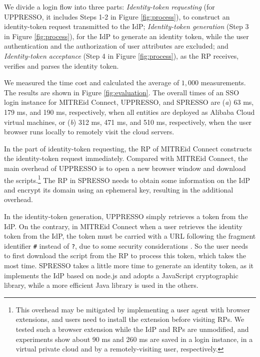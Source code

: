 We divide a login flow into three parts:
{\em Identity-token requesting} (for UPPRESSO, it includes Steps 1-2 in Figure \ref{fig:process}),
  to construct an identity-token request transmitted to the IdP;
{\em Identity-token generation} (Step 3 in Figure \ref{fig:process}),
    for the IdP to generate an identity token, while the user authentication and  the authorization of user attributes are excluded;
and {\em Identity-token acceptance} (Step 4 in Figure \ref{fig:process}),
    as the RP receives, verifies and parses the identity token.



We measured the time cost
     and calculated the average of $1,000$ measurements.
The results are shown in Figure \ref{fig:evaluation}.
The overall times of an SSO login instance for MITREid Connect, UPPRESSO, and SPRESSO are
 (\emph{a}) 63 ms, 179 ms, and 190 ms, respectively, when all entities are deployed as Alibaba Cloud virtual machines,
or
 (\emph{b})
312 ms, 471 ms, and 510 ms, respectively, when the user browser runs locally to remotely visit the cloud servers.

In the part of identity-token requesting, %
the RP of MITREid Connect constructs the identity-token request immediately.
Compared with MITREid Connect, the main overhead of UPPRESSO is to open a new browser window and download the scripts.\footnote{This overhead may be mitigated %
    by implementing a user agent with browser extensions,
and users need to install the extension
    before visiting RPs.
We tested such a browser extension while the IdP and RPs are unmodified,
and experiments show about 90 ms and 260 ms are saved in a login instance,
    in a virtual private cloud and by a remotely-visiting user, respectively.}
The RP in SPRESSO needs  to obtain some information on the IdP  %
     and encrypt its domain using an ephemeral key, resulting in the additional overhead.




In the identity-token generation,
UPPRESSO simply retrieves a token from the IdP.
On the contrary, in MITREid Connect when a user retrieves the identity token from the IdP,
 the token must be carried with a URL following the fragment identifier \verb+#+ instead of \verb+?+, due to some security considerations \cite{de2014oauth}.
So the user needs to first download the script from the RP to process this token, which takes the most time.
SPRESSO takes a little more time to generate an identity token,
    as it implements the IdP based on node.js and adopts a JavaScript cryptographic library,
 while a more efficient Java library is used in the others.


